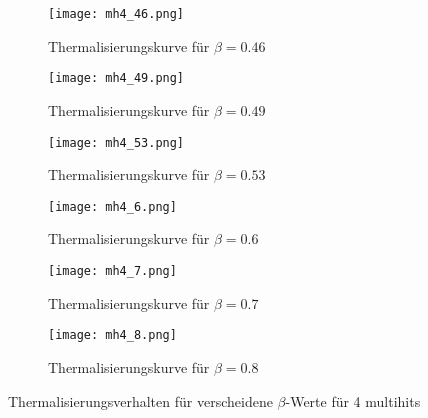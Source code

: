 \documentclass[12pt]{article}
\begin{document}
    \vspace*{-4cm}\begin{figure}[H]\hspace*{-1.5cm}
        \begin{subfigure}{0.4\textwidth}
        \texttt{[image: mh4\_46.png]}
        \caption{Thermalisierungskurve für $\beta=0.46$}
        \end{subfigure}
        \hfill
        \begin{subfigure}{0.4\textwidth}
        \hspace*{-0.8cm}
        \texttt{[image: mh4\_49.png]}
        \caption{Thermalisierungskurve für $\beta=0.49$}
        \end{subfigure}
        \hfill
        \hspace*{-1.5cm}
        \begin{subfigure}{0.4\textwidth}
        \texttt{[image: mh4\_53.png]}
        \caption{Thermalisierungskurve für $\beta=0.53$}
        \end{subfigure}
        \hfill
        \begin{subfigure}{0.4\textwidth}
        \hspace*{-0.8cm}
        \texttt{[image: mh4\_6.png]}
        \caption{Thermalisierungskurve für $\beta=0.6$}
        \end{subfigure}
        \hfill
        \hspace*{-1.5cm}
        \begin{subfigure}{0.4\textwidth}
        \texttt{[image: mh4\_7.png]}
        \caption{Thermalisierungskurve für $\beta=0.7$}
        \end{subfigure}
        \hfill
        \begin{subfigure}{0.4\textwidth}
        \hspace*{-0.8cm}
        \texttt{[image: mh4\_8.png]}
        \caption{Thermalisierungskurve für $\beta=0.8$}
        \end{subfigure}
        \hfill
        \caption{Thermalisierungsverhalten für verscheidene $\beta$-Werte für 4 multihits}
        \end{figure}
\end{document}
